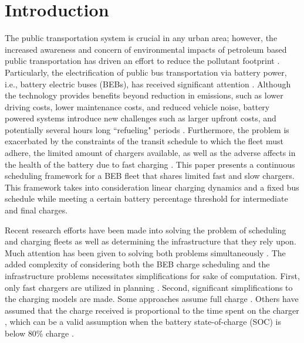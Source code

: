 \documentclass[letterpaper, 10pt, conference]{IEEEtran}
\begin{document}
\section{Introduction}
\label{sec:introduction}
The public transportation system is crucial in any urban area; however, the increased awareness and concern of
environmental impacts of petroleum based public transportation has driven an effort to reduce the pollutant footprint
\cite{DeFilippo2014, Xylia2018, Guida2017, Li2016}. Particularly, the electrification of public bus transportation via
battery power, i.e., battery electric buses (BEBs), has received significant attention \cite{Li2016}. Although the
technology provides benefits beyond reduction in emissions, such as lower driving costs, lower maintenance costs, and
reduced vehicle noise, battery powered systems introduce new challenges such as larger upfront costs, and potentially
several hours long ``refueling" periods \cite{Xylia2018, Li2016}. Furthermore, the problem is exacerbated by the
constraints of the transit schedule to which the fleet must adhere, the limited amount of chargers available, as well as
the adverse affects in the health of the battery due to fast charging \cite{Lutsey2019}. This paper presents a
continuous scheduling framework for a BEB fleet that shares limited fast and slow chargers. This framework takes into
consideration linear charging dynamics and a fixed bus schedule while meeting a certain battery percentage threshold for
intermediate and final charges.

Recent research efforts have been made into solving the problem of scheduling and charging fleets as well as determining
the infrastructure that they rely upon. Much attention has been given to solving both problems simultaneously \cite{Wei2018,
  Sebastiani2016, Hoke2014, Wang2017}. The added complexity of considering both the BEB charge scheduling and the
infrastructure problems necessitates simplifications for sake of computation. First, only fast chargers are utilized in
planning \cite{Wei2018, Sebastiani2016, Wang2017, Zhou2020, Liu2020, Yang2018, Wang2017a, Qin2016}. Second, significant
simplifications to the charging models are made. Some approaches assume full charge \cite{Wei2018, Wang2017, Zhou2020,
  Wang2017a}. Others have assumed that the charge received is proportional to the time spent on the charger
\cite{Liu2020, Yang2018}, which can be a valid assumption when the battery state-of-charge (SOC) is below 80\% charge
\cite{Liu2020}.
\end{document}
